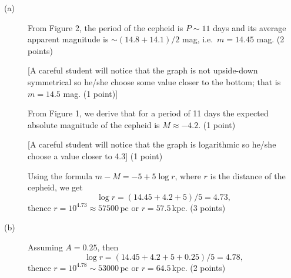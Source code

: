 \begin{description}
\item[(a)] From Figure 2, %
  the period of the cepheid is $P \sim 11$ days and
  its average apparent magnitude is $\sim(14.8 + 14.1)/2$ mag, i.e.\
  $m = 14.45$ mag. \hfill(2 points)

  [A careful student will notice that the graph is not upside-down symmetrical
  so he/she choose some value closer to the bottom; that is $m = 14.5$ mag.
  \hfill(1 point)]

  From Figure 1, %
  we derive that for a period of 11 days the expected absolute
  magnitude of the cepheid is $M \approx -4.2$. \hfill(1 point)

  [A careful student will notice that the graph is logarithmic so he/she
  choose a value closer to 4.3] \hfill(1 point)

  Using the formula $m - M = -5 + 5\log r$, where $r$ is the distance of the
  cepheid, we get
  \[ \log r = (14.45 + 4.2 + 5)/5 = 4.73, \]
  thence $r = 10^{4.73} \approx 57500$\,pc or $r = 57.5$\,kpc.
  \hfill(3 points)
\item[(b)] Assuming $A = 0.25$, then
  \[ \log r = (14.45 + 4.2 + 5 + 0.25)/5 = 4.78, \]
  thence $r = 10^{4.78} \sim 53000$\,pc or $r = 64.5$\,kpc.
  \hfill(2 points)
\end{description}
